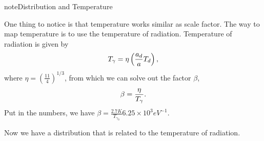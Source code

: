 \documentclass[letterpaper,12pt,english]{sphinxmanual}
\begin{document}
\begin{notice}{note}{Distribution and Temperature}

One thing to notice is that temperature works similar as scale factor. The way to map temperature is to use the temperature of radiation. Temperature of radiation is given by \footnotemark[6]
\begin{gather}
\begin{split}T_\gamma = \eta \left( \frac{a_d}{a} T_d \right),\end{split}\notag
\end{gather}
where \(\eta = \left( \frac{11}{4} \right)^{1/3}\), from which we can solve out the factor \(\beta\),
\begin{gather}
\begin{split}\beta = \frac{\eta}{T_\gamma}.\end{split}\notag
\end{gather}
Put in the numbers, we have \(\beta = \frac{2.7K}{T_{\gamma_0}} 6.25\times 10^{3} eV^{-1}\).

Now we have a distribution that is related to the temperature of radiation.
\end{notice}
\end{document}
